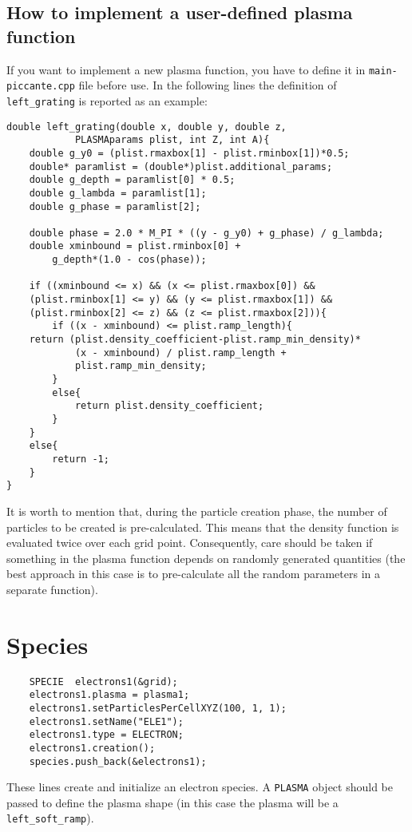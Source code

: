 \documentclass[11pt,a4paper]{report}
\begin{document}
\subsection{How to implement a user-defined plasma function}\label{subsection_upfunc}
If you want to implement a new plasma function, you have to define it in \verb+main-piccante.cpp+ file before use. In the following lines the definition of \verb+left_grating+ is reported as an example:
\begin{lstlisting}
double left_grating(double x, double y, double z,
			PLASMAparams plist, int Z, int A){
	double g_y0 = (plist.rmaxbox[1] - plist.rminbox[1])*0.5;
	double* paramlist = (double*)plist.additional_params;
	double g_depth = paramlist[0] * 0.5;
	double g_lambda = paramlist[1];
	double g_phase = paramlist[2];

	double phase = 2.0 * M_PI * ((y - g_y0) + g_phase) / g_lambda;
	double xminbound = plist.rminbox[0] +
		g_depth*(1.0 - cos(phase));

	if ((xminbound <= x) && (x <= plist.rmaxbox[0]) &&
	(plist.rminbox[1] <= y) && (y <= plist.rmaxbox[1]) &&
	(plist.rminbox[2] <= z) && (z <= plist.rmaxbox[2])){
		if ((x - xminbound) <= plist.ramp_length){
	return (plist.density_coefficient-plist.ramp_min_density)*
			(x - xminbound) / plist.ramp_length +
			plist.ramp_min_density;
		}
		else{
			return plist.density_coefficient;
		}
	}
	else{
		return -1;
	}
}
\end{lstlisting}
It is worth to mention that, during the particle creation phase, the number of particles to be created is pre-calculated. This means that the density function is evaluated twice over each grid point. Consequently, care should be taken if something in the plasma function depends on randomly generated quantities (the best approach in this case is to pre-calculate all the random parameters in a separate function).

\section{Species}\label{section_species}
\begin{lstlisting}
	SPECIE  electrons1(&grid);
	electrons1.plasma = plasma1;
	electrons1.setParticlesPerCellXYZ(100, 1, 1);
	electrons1.setName("ELE1");
	electrons1.type = ELECTRON;
	electrons1.creation();
	species.push_back(&electrons1);
\end{lstlisting}
These lines create and initialize an electron species. A \verb+PLASMA+ object should be passed to define the plasma shape (in this case the plasma will be a \verb+left_soft_ramp+).
\end{document}
